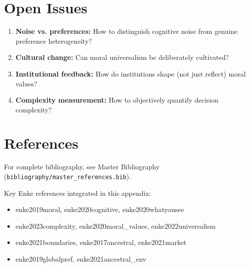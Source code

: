 \section{Open Issues}

\begin{enumerate}
    \item \textbf{Noise vs. preferences:} How to distinguish cognitive noise from genuine preference heterogeneity?
    \item \textbf{Cultural change:} Can moral universalism be deliberately cultivated?
    \item \textbf{Institutional feedback:} How do institutions shape (not just reflect) moral values?
    \item \textbf{Complexity measurement:} How to objectively quantify decision complexity?
\end{enumerate}

\section{References}

\nocite{bcm_master}

For complete bibliography, see Master Bibliography (\texttt{bibliography/master\_references.bib}).

Key Enke references integrated in this appendix:
\begin{itemize}[nosep]
    \item enke2019moral, enke2020cognitive, enke2020whatyousee
    \item enke2023complexity, enke2020moral\_values, enke2022universalism
    \item enke2021boundaries, enke2017ancestral, enke2021market
    \item enke2019globalpref, enke2021ancestral\_env
\end{itemize}


